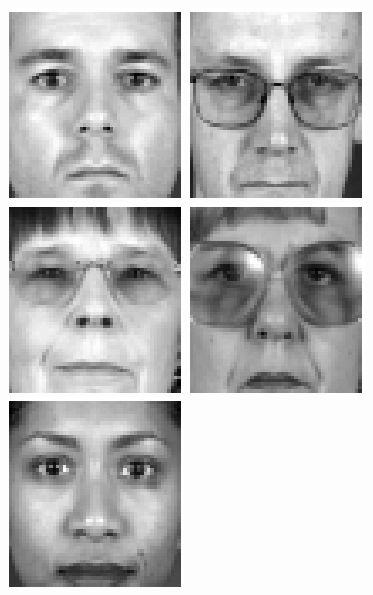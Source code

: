 \begin{figure}
\begin{center}
\includegraphics[scale=0.12]{ch4/figures/XM2VTS_31.png}
\includegraphics[scale=0.12]{ch4/figures/XM2VTS_32.png}\\
\includegraphics[scale=0.12]{ch4/figures/XM2VTS_33.png}
\includegraphics[scale=0.12]{ch4/figures/XM2VTS_34.png}
\includegraphics[scale=0.12]{ch4/figures/XM2VTS_35.png}

\end{center}
\end{figure}
